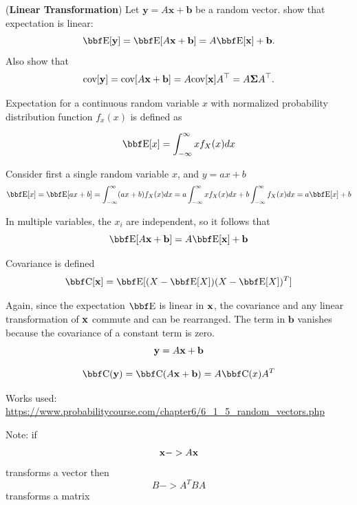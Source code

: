 \documentclass[12pt,letterpaper]{hmcpset}
\begin{document}
\begin{problem}[1]
(\textbf{Linear Transformation}) Let $\mathbf{y} = A\mathbf{x} + \mathbf{b}$ be a random vector.
show that expectation is linear:
\[
    \EE[\yy] = \EE[A\xx + \bb] = A\EE[\xx] + \bb.
\]
Also show that
\[
    {\hbox{cov}}[{\bf y}] = {\hbox{cov}}[A{\bf x} + {\bf b}] = A {\hbox{cov}}[{\bf x}] A^\top = A\hbox{\boldmath$\Sigma$} A^\top.
\]
\end{problem}
\begin{solution}

  Expectation for a continuous random variable $x$ with normalized probability distribution function $f_x(x)$ is defined as

\[
  \EE[x]= \int_{-\infty}^{\infty} xf_X(x)dx
\]

  Consider first a single random variable $x$, and $y = ax + b$
\[
\EE[x] = \EE[ax + b]
         = \int_{-\infty}^{\infty} (ax + b) f_X(x) dx
         = a\int_{-\infty}^{\infty} x f_X(x) dx + b \int_{-\infty}^{\infty} f_X(x) dx
         = a\EE[x] + b
\]

In multiple variables, the $x_i$ are independent, so it follows that
\[
   \EE[A\xx + \bb] = A\EE[\xx] + \bb
\]

Covariance is defined
\[
  \CC[\xx] = \EE[(X - \EE[X])(X - \EE[X])^T]
\]

Again, since the expectation $\EE$ is linear in ${\bf x}$, the covariance and any linear transformation of ${\bf x}$ commute and can be rearranged.  The term in $\mathbf{b}$ vanishes because the covariance of a constant term is zero.
\[
  {\bf y} = A{\bf x} + {\bf b}
\]

\[
  \CC(\yy) = \CC(A\xx + \bb)
           = A\CC(x)A^T
\]

Works used: \url{https://www.probabilitycourse.com/chapter6/6_1_5_random_vectors.php}

Note: if
\[
{\bf x} -> A{\bf x}
\]
transforms a vector then
\[
  B -> A^T B A
\] transforms a matrix

    \vfill
\end{solution}
\newpage
\end{document}
